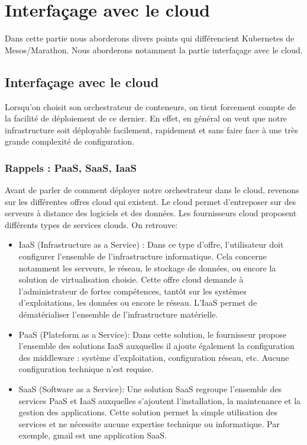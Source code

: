 \documentclass[11pt,fleqn]{book} %
\begin{document}
\chapter{Interfaçage avec le cloud }
\vspace{-2cm}
Dans cette partie nous aborderons divers points qui différencient Kubernetes de Mesos/Marathon. Nous aborderons notamment la partie interfaçage avec le cloud.

\section*{Interfaçage avec le cloud}
Lorsqu'on choisit son orchestrateur de conteneurs, on tient forcement compte de la facilité de déploiement de ce dernier. En effet, en général on veut que notre infrastructure soit déployable facilement, rapidement et sans faire face à une très grande complexité de configuration.

\subsection*{Rappels : PaaS, SaaS, IaaS}
Avant de parler de comment déployer notre orchestrateur dans le cloud, revenons sur les différentes offres cloud qui existent. Le cloud permet d’entreposer sur des serveurs à distance des logiciels et des données. Les fournisseurs cloud proposent différents types de services clouds. On retrouve:
\begin{itemize}
    \item IaaS (Infrastructure as a Service) : Dans ce type d'offre, l'utilisateur doit configurer l'ensemble de l'infrastructure informatique. Cela concerne notamment les serveurs, le réseau, le stockage de données, ou encore la solution de virtualisation choisie. Cette offre cloud demande à l'administrateur de fortes compétences, tantôt sur les systèmes d'exploitations, les données ou encore le réseau. L'IaaS permet de dématérialiser l'ensemble de l'infrastructure matérielle.
    \item PaaS (Plateform as a Service): Dans cette solution, le fournisseur propose l'ensemble des solutions IaaS auxquelles il ajoute également la configuration des middleware : système d'exploitation, configuration réseau, etc. Aucune configuration technique n'est requise.
    \item SaaS (Software as a Service): Une solution SaaS regroupe l'ensemble des services PaaS et IaaS auxquelles s'ajoutent l'installation, la maintenance et la gestion des applications. Cette solution permet la simple utilisation des services et ne nécessite aucune expertise technique ou informatique. Par exemple, gmail est une application SaaS.\\
\end{itemize}
\end{document}

